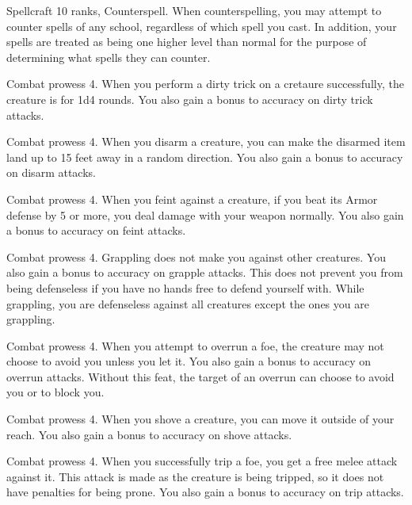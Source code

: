 \featpres Spellcraft 10 ranks, Counterspell.
\featben When counterspelling, you may attempt to counter spells of any school, regardless of which spell you cast.
In addition, your spells are treated as being one higher level than normal for the purpose of determining what spells they can counter.

\featpre Combat prowess 4.
\featben When you perform a dirty trick on a cretaure successfully, the creature is \impaired for 1d4 rounds.
You also gain a  bonus to accuracy on dirty trick attacks.

\featpre Combat prowess 4.
\featben When you disarm a creature, you can make the disarmed item land up to 15 feet away in a random direction.
You also gain a  bonus to accuracy on disarm attacks.

\featpre Combat prowess 4.
\featben When you feint against a creature, if you beat its Armor defense by 5 or more, you deal damage with your weapon normally.
You also gain a  bonus to accuracy on feint attacks.

\featpre Combat prowess 4.
\featben Grappling does not make you  against other creatures.
You also gain a  bonus to accuracy on grapple attacks.
This does not prevent you from being defenseless if you have no hands free to defend yourself with.
While grappling, you are defenseless against all creatures except the ones you are grappling.

\featpre Combat prowess 4.
\featben When you attempt to overrun a foe, the creature may not choose to avoid you unless you let it.
You also gain a  bonus to accuracy on overrun attacks.
Without this feat, the target of an overrun can choose to avoid you or to block you.

\featpre Combat prowess 4.
\featben When you shove a creature, you can move it outside of your reach.
You also gain a  bonus to accuracy on shove attacks.

\featpre Combat prowess 4.
\featben When you successfully trip a foe, you get a free melee attack against it.
This attack is made as the creature is being tripped, so it does not have penalties for being prone.
You also gain a  bonus to accuracy on trip attacks.

